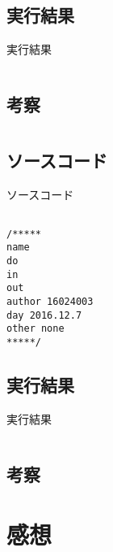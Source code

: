 \documentclass[a4j,titlepage]{jarticle}
\begin{document}
\subsection{実行結果}
\begin{itembox}[l]{実行結果}
\begin{verbatim}

\end{verbatim}
\end{itembox}

\subsection{考察}

\section{}
\subsection{ソースコード}
\begin{breakitembox}[l]{ソースコード}
\begin{verbatim}

/*****
name 
do 
in 
out 
author 16024003
day 2016.12.7
other none
*****/

\end{verbatim}
\end{breakitembox}

\subsection{実行結果}
\begin{itembox}[l]{実行結果}
\begin{verbatim}

\end{verbatim}
\end{itembox}

\subsection{考察}


\section{感想}
\end{document}
